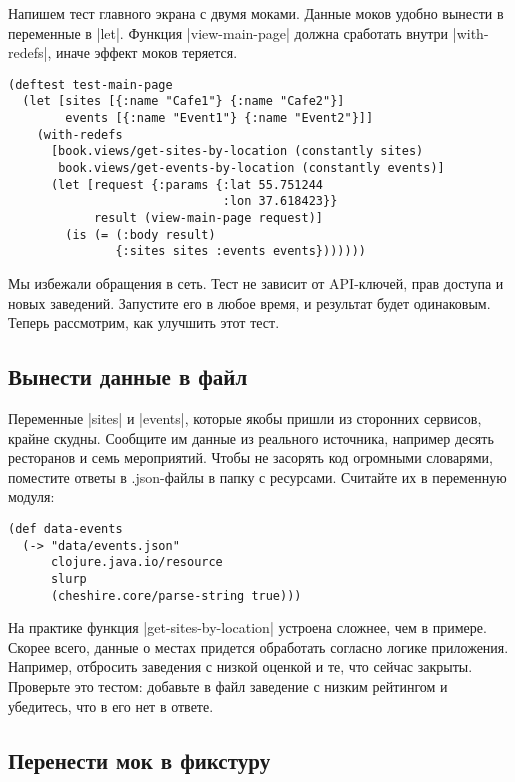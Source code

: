 Напишем тест главного экрана с двумя моками. Данные моков удобно вынести в
переменные в \spverb|let|. Функция \spverb|view-main-page| должна сработать
внутри \spverb|with-redefs|, иначе эффект моков теряется.

\begin{verbatim}
(deftest test-main-page
  (let [sites [{:name "Cafe1"} {:name "Cafe2"}]
        events [{:name "Event1"} {:name "Event2"}]]
    (with-redefs
      [book.views/get-sites-by-location (constantly sites)
       book.views/get-events-by-location (constantly events)]
      (let [request {:params {:lat 55.751244
                              :lon 37.618423}}
            result (view-main-page request)]
        (is (= (:body result)
               {:sites sites :events events}))))))
\end{verbatim}

Мы избежали обращения в сеть. Тест не зависит от API-ключей, прав доступа и
новых заведений. Запустите его в любое время, и результат будет
одинаковым. Теперь рассмотрим, как улучшить этот тест.

\subsection{Вынести данные в файл}

Переменные \spverb|sites| и \spverb|events|, которые якобы пришли из сторонних
сервисов, крайне скудны. Сообщите им данные из реального источника, например
десять ресторанов и семь мероприятий. Чтобы не засорять код огромными словарями,
поместите ответы в .json-файлы в папку с ресурсами. Считайте их в переменную
модуля:

\begin{verbatim}
(def data-events
  (-> "data/events.json"
      clojure.java.io/resource
      slurp
      (cheshire.core/parse-string true)))
\end{verbatim}

На практике функция \spverb|get-sites-by-location| устроена сложнее, чем в
примере. Скорее всего, данные о местах придется обработать согласно логике
приложения. Например, отбросить заведения с низкой оценкой и те, что сейчас
закрыты. Проверьте это тестом: добавьте в файл заведение с низким рейтингом и
убедитесь, что в его нет в ответе.

\subsection{Перенести мок в фикстуру}

